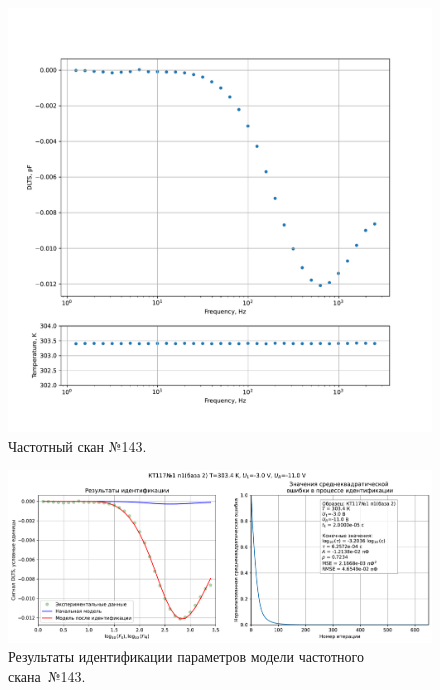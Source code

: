 \begin{figure}[!ht]
    \centering
    \includegraphics[width=1\textwidth]{../plots/КТ117№1_п1(база 2)_2500Гц-1Гц_1пФ_+30С_-3В-11В_200мВ_20мкс_шаг_0,1.pdf}
    \caption{Частотный скан №143.}
    \label{pic:frequency_scan_143}
\end{figure}

\begin{figure}[!ht]
    \centering
    \includegraphics[width=1\textwidth]{../plots/КТ117№1_п1(база 2)_2500Гц-1Гц_1пФ_+30С_-3В-11В_200мВ_20мкс_шаг_0,1_model.pdf}
    \caption{Результаты идентификации параметров модели частотного скана~№143.}
    \label{pic:frequency_scan_model143}
\end{figure}

\pagebreak


